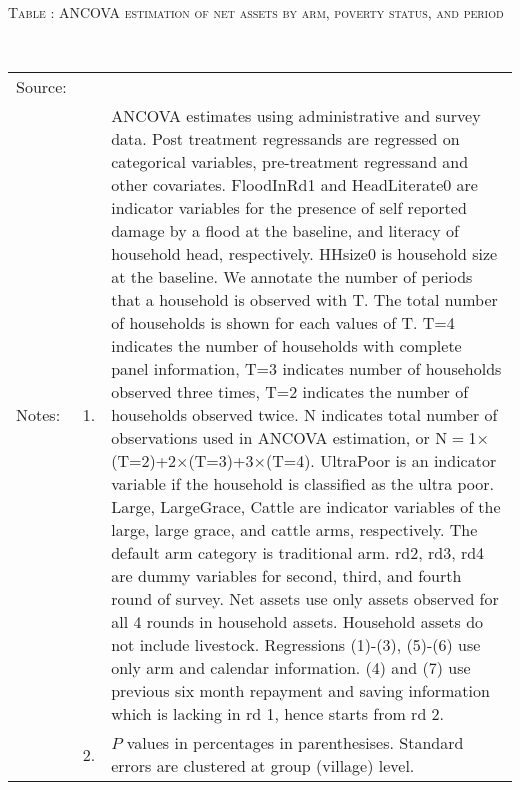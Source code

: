 \hspace{-1cm}\begin{minipage}[t]{14cm}
\hfil\textsc{\normalsize Table \thetable: ANCOVA estimation of net assets by arm, poverty status, and period\label{tab ANCOVA narrow net assets timevarying poverty status}}\\
\setlength{\tabcolsep}{1pt}
\setlength{\baselineskip}{8pt}
\renewcommand{\arraystretch}{.55}
\hfil{}\\
\renewcommand{\arraystretch}{.8}
\setlength{\tabcolsep}{1pt}
\begin{tabular}{>{\hfill\scriptsize}p{1cm}<{}>{\hfill\scriptsize}p{.25cm}<{}>{\scriptsize}p{12cm}<{\hfill}}
Source:& \multicolumn{2}{l}{\scriptsize Estimated with GUK administrative and survey data.}\\
Notes: & 1. & ANCOVA estimates using administrative and survey data. Post treatment regressands are regressed on categorical variables, pre-treatment regressand and other covariates. \textsf{FloodInRd1} and \textsf{HeadLiterate0} are indicator variables for the presence of self reported damage by a flood at the baseline, and literacy of household head, respectively. \textsf{HHsize0} is household size at the baseline. We annotate the number of periods that a household is observed with \textsf{T}. The total number of households is shown for each values of \textsf{T}. \textsf{T=4} indicates the number of households with complete panel information, \textsf{T=3} indicates number of households observed three times, \textsf{T=2} indicates the number of households observed twice. \textsf{N} indicates total number of observations used in ANCOVA estimation, or \textsf{N$=$1$\times$(T=2)+2$\times$(T=3)+3$\times$(T=4)}.  \textsf{UltraPoor} is an indicator variable if the household is classified as the ultra poor. \textsf{Large}, \textsf{LargeGrace}, \textsf{Cattle} are indicator variables of the \textsf{large}, \textsf{large grace}, and \textsf{cattle} arms, respectively. The default arm category is \textsf{traditional} arm. \textsf{rd2, rd3, rd4} are dummy variables for second, third, and fourth round of survey. Net assets use only assets observed for all 4 rounds in household assets. Household assets do not include livestock. Regressions (1)-(3), (5)-(6) use only arm and calendar information. (4) and (7) use previous six month repayment and saving information which is lacking in rd 1, hence starts from rd 2.\\
& 2. & $P$ values in percentages in parenthesises. Standard errors are clustered at group (village) level.
\end{tabular}
\end{minipage}

